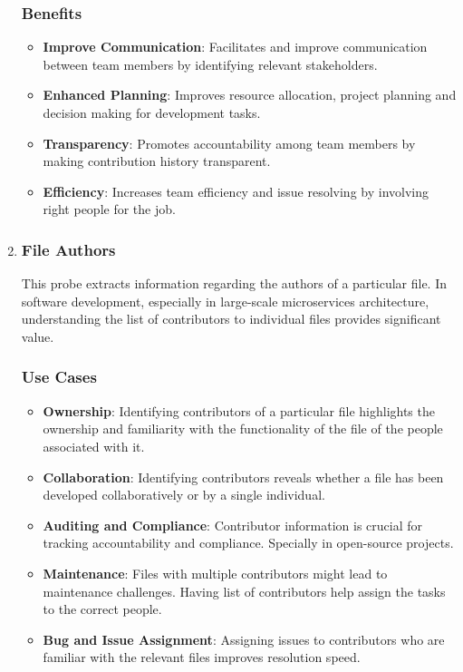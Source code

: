 \begin{enumerate}[leftmargin=*, label=\arabic*.]
	\subsubsection{Benefits}
	\begin{itemize}[label=$\bullet$]
		\item \textbf{Improve Communication}: Facilitates and improve communication between team members by identifying relevant stakeholders.
		\item \textbf{Enhanced Planning}: Improves resource allocation, project planning and decision making for development tasks.
		\item \textbf{Transparency}: Promotes accountability among team members by making contribution history transparent.
		\item \textbf{Efficiency}: Increases team efficiency and issue resolving by involving right people for the job.
	\end{itemize}
	
    \item \subsubsection*{File Authors}
	This probe extracts information regarding the authors of a particular file. In software development, especially in large-scale microservices architecture, understanding the list of contributors to individual files provides significant value.
	\subsubsection{Use Cases}
	\begin{itemize}[label=$\bullet$]
		\item \textbf{Ownership}: Identifying contributors of a particular file highlights the ownership and familiarity with the functionality of the file of the people associated with it.
		\item \textbf{Collaboration}: Identifying contributors reveals whether a file has been developed collaboratively or by a single individual.
		\item \textbf{Auditing and Compliance}: Contributor information is crucial for tracking accountability and compliance. Specially in open-source projects.
		\item \textbf{Maintenance}: Files with multiple contributors might lead to maintenance challenges. Having list of contributors help assign the tasks to the correct people.
		\item \textbf{Bug and Issue Assignment}: Assigning issues to contributors who are familiar with the relevant files improves resolution speed.
	\end{itemize}

\end{enumerate}
